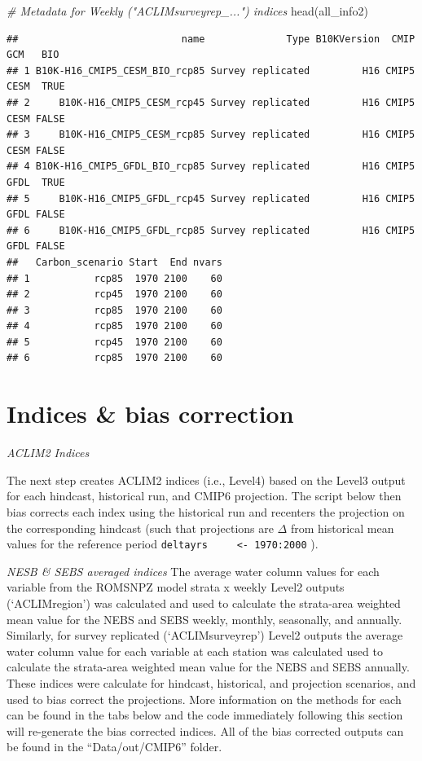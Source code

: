 \documentclass[
]{article}
\newenvironment{Shaded}{\begin{snugshade}}{\end{snugshade}}
\newcommand{\CommentTok}[1]{\textcolor[rgb]{0.56,0.35,0.01}{\textit{#1}}}
\newcommand{\FunctionTok}[1]{\textcolor[rgb]{0.00,0.00,0.00}{#1}}
\newcommand{\NormalTok}[1]{#1}
\begin{document}
\begin{Shaded}
\begin{Highlighting}[]
    \CommentTok{\# Metadata for Weekly ("ACLIMsurveyrep\_...") indices}
    \FunctionTok{head}\NormalTok{(all\_info2)}
\end{Highlighting}
\end{Shaded}

\begin{verbatim}
##                            name              Type B10KVersion  CMIP  GCM   BIO
## 1 B10K-H16_CMIP5_CESM_BIO_rcp85 Survey replicated         H16 CMIP5 CESM  TRUE
## 2     B10K-H16_CMIP5_CESM_rcp45 Survey replicated         H16 CMIP5 CESM FALSE
## 3     B10K-H16_CMIP5_CESM_rcp85 Survey replicated         H16 CMIP5 CESM FALSE
## 4 B10K-H16_CMIP5_GFDL_BIO_rcp85 Survey replicated         H16 CMIP5 GFDL  TRUE
## 5     B10K-H16_CMIP5_GFDL_rcp45 Survey replicated         H16 CMIP5 GFDL FALSE
## 6     B10K-H16_CMIP5_GFDL_rcp85 Survey replicated         H16 CMIP5 GFDL FALSE
##   Carbon_scenario Start  End nvars
## 1           rcp85  1970 2100    60
## 2           rcp45  1970 2100    60
## 3           rcp85  1970 2100    60
## 4           rcp85  1970 2100    60
## 5           rcp45  1970 2100    60
## 6           rcp85  1970 2100    60
\end{verbatim}

\hypertarget{indices-bias-correction}{%
\section{Indices \& bias correction}\label{indices-bias-correction}}

\emph{ACLIM2 Indices}

The next step creates ACLIM2 indices (i.e., Level4) based on the Level3
output for each hindcast, historical run, and CMIP6 projection. The
script below then bias corrects each index using the historical run and
recenters the projection on the corresponding hindcast (such that
projections are \(\Delta\) from historical mean values for the reference
period \texttt{deltayrs\ \ \ \ \ \textless{}-\ 1970:2000} ).

\emph{NESB \& SEBS averaged indices} The average water column values for
each variable from the ROMSNPZ model strata x weekly Level2 outputs
(`ACLIMregion') was calculated and used to calculate the strata-area
weighted mean value for the NEBS and SEBS weekly, monthly, seasonally,
and annually. Similarly, for survey replicated (`ACLIMsurveyrep') Level2
outputs the average water column value for each variable at each station
was calculated used to calculate the strata-area weighted mean value for
the NEBS and SEBS annually. These indices were calculate for hindcast,
historical, and projection scenarios, and used to bias correct the
projections. More information on the methods for each can be found in
the tabs below and the code immediately following this section will
re-generate the bias corrected indices. All of the bias corrected
outputs can be found in the ``Data/out/CMIP6'' folder.
\end{document}
